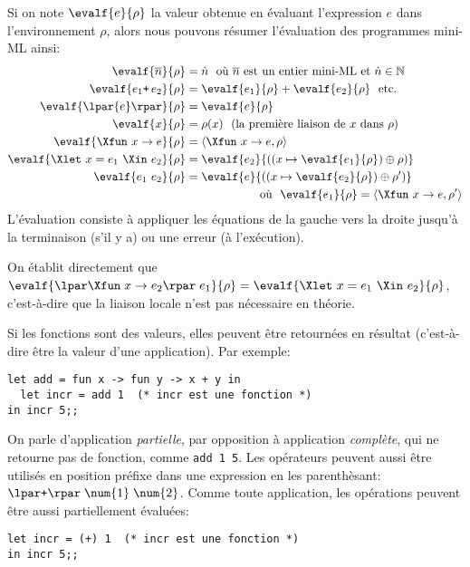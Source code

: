 
Si on note $\evalf{e}{\rho}$ la valeur obtenue en évaluant
l'expression $e$ dans l'environnement $\rho$, alors nous pouvons
résumer l'évaluation des programmes mini-ML ainsi:
\begin{align*}
\evalf{\overline{n}}{\rho} &= \dot{n} \ \ \textnormal{où $\overline{n}$
  est un entier mini-ML et $\dot{n} \in \mathbb{N}$}\\
\evalf{e_1 \texttt{+} \, e_2}{\rho} &= \evalf{e_1}{\rho} +
\evalf{e_2}{\rho} \ \ \textnormal{etc.}\\ 
\evalf{\lpar{e}\rpar}{\rho} &= \evalf{e}{\rho}\\
\evalf{x}{\rho} &= \rho(x) \ \ \textnormal{(la première liaison de $x$ dans $\rho$)}\\
\evalf{\Xfun \,\, x \rightarrow e}{\rho} &= \langle\Xfun \,\, x
\rightarrow e, \rho\rangle\\
\evalf{\Xlet \,\, x = e_1 \,\, \Xin \,\, e_2}{\rho} &= \evalf{e_2}{((x
  \mapsto \evalf{e_1}{\rho}) \oplus \rho)}\\
\evalf{e_1 \,\, e_2}{\rho} &= \evalf{e}{((x \mapsto \evalf{e_2}{\rho})
  \oplus \rho')}\\
&\phantom{=\llbracket} \textnormal{où} \ \ \evalf{e_1}{\rho} = \langle\Xfun \,\, x
\rightarrow e,\rho'\rangle
\end{align*}
L'évaluation consiste à appliquer les équations de la gauche vers la
droite jusqu'à la terminaison (s'il y a) ou une erreur (à
l'exécution).

On établit directement que $\evalf{\lpar\Xfun \; x \rightarrow
  e_2\rpar \; e_1}{\rho} = \evalf{\Xlet \,\, x = e_1 \,\, \Xin \,\,
  e_2}{\rho}$, c'est-à-dire que la liaison locale n'est pas nécessaire
en théorie.


Si les fonctions sont des valeurs, elles peuvent être retournées en
résultat (c'est-à-dire être la valeur d'une application). Par exemple:
{\small
\begin{verbatim}
let add = fun x -> fun y -> x + y in
  let incr = add 1  (* incr est une fonction *)
in incr 5;;
\end{verbatim}
}
On parle d'application \emph{partielle}, par opposition à application
\emph{complète}, qui ne retourne pas de fonction, comme
\verb|add 1 5|. Les opérateurs peuvent aussi être utilisés en position
préfixe dans une expression en les parenthèsant: $\lpar\texttt{+}\rpar \;
\num{1} \; \num{2}$. Comme toute application, les opérations peuvent
être aussi partiellement évaluées:
{\small
\begin{verbatim}
let incr = (+) 1  (* incr est une fonction *)
in incr 5;;
\end{verbatim}
}


